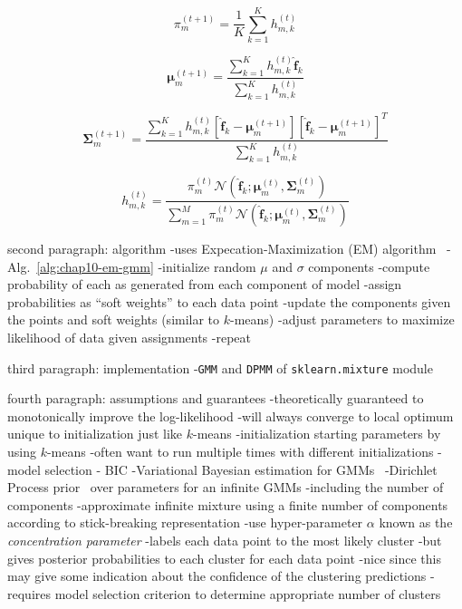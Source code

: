 \begin{equation}
\label{eqn:em-weights}
\pi_{m}^{(t+1)} = \frac{1}{K}\displaystyle\sum\limits_{k=1}^{K} h_{m,k}^{(t)}
\end{equation}

\begin{equation}
\label{eqn:em-means}
\boldsymbol{\mu}_{m}^{(t+1)} = \frac{\displaystyle\sum\limits_{k=1}^{K}h_{m,k}^{(t)}\boldsymbol{\hat{f}}_{k}}{\displaystyle\sum\limits_{k=1}^{K}h_{m,k}^{(t)}}
\end{equation}

\begin{equation}
\label{eqn:em-covariances}
\boldsymbol{\Sigma}_{m}^{(t+1)} = \frac{\displaystyle\sum\limits_{k=1}^{K}h_{m,k}^{(t)}\left[ \boldsymbol{\hat{f}}_{k} - \boldsymbol{\mu}_{m}^{(t+1)}\right]\left[ \boldsymbol{\hat{f}}_{k} - \boldsymbol{\mu}_{m}^{(t+1)}\right]^{T}}{\displaystyle\sum\limits_{k=1}^{K}h_{m,k}^{(t)}}
\end{equation}

\begin{equation}
\label{eqn:em-posterior-probs}
h_{m,k}^{(t)} = \frac{\pi_{m}^{(t)} \mathcal{N}\left( \boldsymbol{\hat{f}}_{k}; \boldsymbol{\mu}_{m}^{(t)}, \boldsymbol{\Sigma}_{m}^{(t)} \right)}{\displaystyle\sum\limits_{m=1}^{M}\pi_{m}^{(t)} \mathcal{N}\left( \boldsymbol{\hat{f}}_{k}; \boldsymbol{\mu}_{m}^{(t)}, \boldsymbol{\Sigma}_{m}^{(t)} \right)}
\end{equation}

second paragraph: algorithm
-uses Expecation-Maximization (EM) algorithm~\cite{dempster1977em}
-Alg.~\ref{alg:chap10-em-gmm}
  -initialize random $\mu$ and $\sigma$ components
  -compute probability of each as generated from each component of model
  -assign probabilities as ``soft weights'' to each data point 
  -update the components given the points and soft weights (similar to $k$-means)
    -adjust parameters to maximize likelihood of data given assignments
  -repeat
  
third paragraph: implementation
-\texttt{GMM} and \texttt{DPMM} of \texttt{sklearn.mixture} module

fourth paragraph: assumptions and guarantees
-theoretically guaranteed to monotonically improve the log-likelihood
-will always converge to local optimum unique to initialization just like $k$-means
  -initialization starting parameters by using $k$-means
-often want to run multiple times with different initializations
-model selection - BIC
-Variational Bayesian estimation for \acp{GMM}~\cite{attias2000variational,blei2006variational}
  -Dirichlet Process prior~\cite{ferguson1973dirichlet} over parameters for an infinite \acp{GMM}
    -including the number of components
    -approximate infinite mixture using a finite number of components according to stick-breaking representation
    -use hyper-parameter $\alpha$ known as the \textit{concentration parameter}
-labels each data point to the most likely cluster
-but gives posterior probabilities to each cluster for each data point
  -nice since this may give some indication about the confidence of the clustering predictions
-requires model selection criterion to determine appropriate number of clusters

